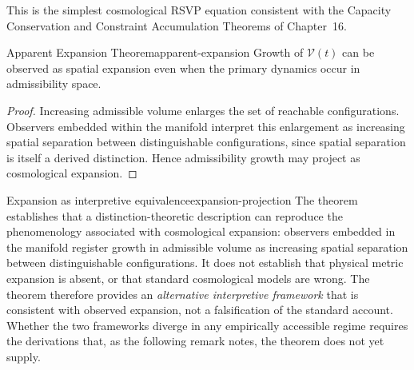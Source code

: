 \documentclass[12pt,twoside,openright]{book}
\begin{document}
This is the simplest cosmological RSVP equation consistent
with the Capacity Conservation and Constraint Accumulation
Theorems of Chapter~16.

\begin{theorem}{Apparent Expansion Theorem}{apparent-expansion}
  Growth of $\mathcal{V}(t)$ can be observed as spatial
  expansion even when the primary dynamics occur in
  admissibility space.
\end{theorem}

\begin{proof}
  Increasing admissible volume enlarges the set of
  reachable configurations. Observers embedded within the
  manifold interpret this enlargement as increasing spatial
  separation between distinguishable configurations, since
  spatial separation is itself a derived distinction.
  Hence admissibility growth may project as cosmological
  expansion.
\end{proof}

\begin{remark}{Expansion as interpretive equivalence}{expansion-projection}
  The theorem establishes that a distinction-theoretic
  description can reproduce the phenomenology associated
  with cosmological expansion: observers embedded in the
  manifold register growth in admissible volume as
  increasing spatial separation between distinguishable
  configurations. It does not establish that physical
  metric expansion is absent, or that standard cosmological
  models are wrong. The theorem therefore provides an
  \emph{alternative interpretive framework} that is
  consistent with observed expansion, not a falsification
  of the standard account. Whether the two frameworks
  diverge in any empirically accessible regime requires
  the derivations that, as the following remark notes,
  the theorem does not yet supply.
\end{remark}
\end{document}
